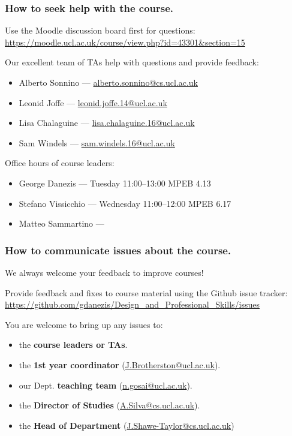 \documentclass{beamer} %
\newcommand\emc[1]{\textcolor{brightblue}{\textbf{#1}}}
\begin{document}
\begin{frame}
\frametitle{How to seek help with the course.} 

Use the Moodle discussion board first for questions: 
\url{https://moodle.ucl.ac.uk/course/view.php?id=43301&section=15}

\vspace{3mm}
Our excellent team of TAs help with questions and provide feedback:
\begin{itemize}
\item Alberto Sonnino --- \url{alberto.sonnino@cs.ucl.ac.uk}
\item Leonid Joffe --- \url{leonid.joffe.14@ucl.ac.uk}
\item Lisa Chalaguine --- \url{lisa.chalaguine.16@ucl.ac.uk}
\item Sam Windels --- \url{sam.windels.16@ucl.ac.uk}
\end{itemize}

\vspace{3mm}
Office hours of course leaders:
\begin{itemize}
\item George Danezis --- Tuesday 11:00--13:00 MPEB 4.13
\item Stefano Vissicchio --- Wednesday 11:00--12:00 MPEB 6.17
\item Matteo Sammartino --- 
\end{itemize}

\end{frame}

\begin{frame}
\frametitle{How to communicate issues about the course.}

We always welcome your feedback to improve courses!

\vspace{3mm}
Provide feedback and fixes to course material using the Github issue tracker:
\url{https://github.com/gdanezis/Design_and_Professional_Skills/issues}

\vspace{3mm}
You are welcome to bring up any issues to:
\begin{itemize}
	\item the \emc{course leaders or TAs}.
	\item the \emc{1st year coordinator} (\url{J.Brotherston@ucl.ac.uk}).
	\item our Dept. \emc{teaching team} (\url{n.gosai@ucl.ac.uk}).
	\item the \emc{Director of Studies} (\url{A.Silva@cs.ucl.ac.uk}).
	\item the \emc{Head of Department} (\url{J.Shawe-Taylor@cs.ucl.ac.uk})
\end{itemize}

\end{frame}
\end{document}

